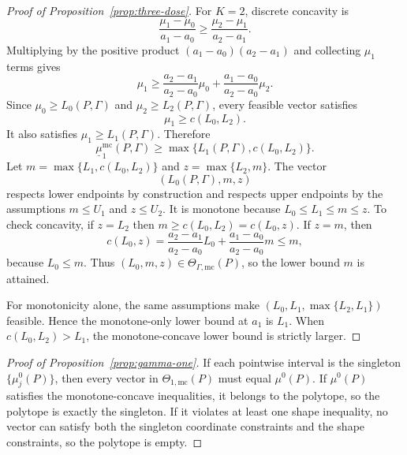 \documentclass[11pt]{article}
\theoremstyle{definition}
\theoremstyle{plain}
\theoremstyle{remark}
\begin{document}
\begin{proof}[Proof of Proposition~\ref{prop:three-dose}]
For \(K=2\), discrete concavity is
\[
  \frac{\mu_1-\mu_0}{a_1-a_0}
  \ge
  \frac{\mu_2-\mu_1}{a_2-a_1}.
\]
Multiplying by the positive product \((a_1-a_0)(a_2-a_1)\) and collecting \(\mu_1\) terms gives
\[
  \mu_1
  \ge
  \frac{a_2-a_1}{a_2-a_0}\mu_0
  +
  \frac{a_1-a_0}{a_2-a_0}\mu_2.
\]
Since \(\mu_0\ge L_0(P,\Gamma)\) and \(\mu_2\ge L_2(P,\Gamma)\), every feasible vector satisfies
\[
  \mu_1\ge c(L_0,L_2).
\]
It also satisfies \(\mu_1\ge L_1(P,\Gamma)\).  Therefore
\[
  \underline\mu^{\mathrm{mc}}_1(P,\Gamma)
  \ge
  \max\{L_1(P,\Gamma),c(L_0,L_2)\}.
\]
Let \(m=\max\{L_1,c(L_0,L_2)\}\) and \(z=\max\{L_2,m\}\).  The vector
\[
  (L_0(P,\Gamma),m,z)
\]
respects lower endpoints by construction and respects upper endpoints by the assumptions \(m\le U_1\) and \(z\le U_2\).  It is monotone because \(L_0\le L_1\le m\le z\).  To check concavity, if \(z=L_2\) then \(m\ge c(L_0,L_2)=c(L_0,z)\).  If \(z=m\), then
\[
  c(L_0,z)
  =
  \frac{a_2-a_1}{a_2-a_0}L_0
  +
  \frac{a_1-a_0}{a_2-a_0}m
  \le m,
\]
because \(L_0\le m\).  Thus \((L_0,m,z)\in\Theta_{\Gamma,\mathrm{mc}}(P)\), so the lower bound \(m\) is attained.

For monotonicity alone, the same assumptions make \((L_0,L_1,\max\{L_2,L_1\})\) feasible.  Hence the monotone-only lower bound at \(a_1\) is \(L_1\).  When \(c(L_0,L_2)>L_1\), the monotone-concave lower bound is strictly larger.
\end{proof}

\begin{proof}[Proof of Proposition~\ref{prop:gamma-one}]
If each pointwise interval is the singleton \(\{\mu_j^0(P)\}\), then every vector in \(\Theta_{1,\mathrm{mc}}(P)\) must equal \(\mu^0(P)\).  If \(\mu^0(P)\) satisfies the monotone-concave inequalities, it belongs to the polytope, so the polytope is exactly the singleton.  If it violates at least one shape inequality, no vector can satisfy both the singleton coordinate constraints and the shape constraints, so the polytope is empty.
\end{proof}
\end{document}
